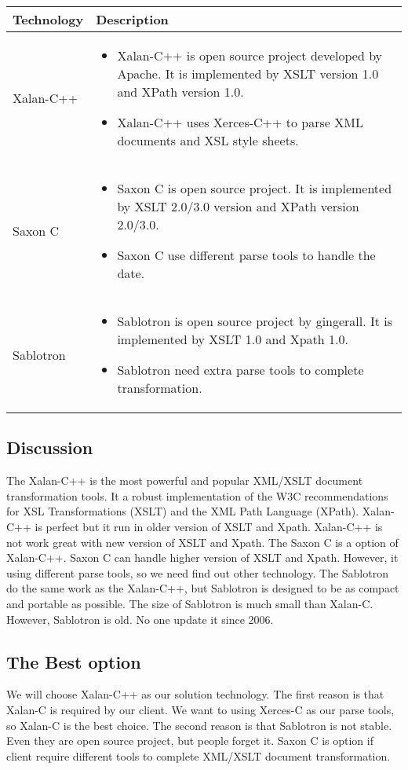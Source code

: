 \begin{center}
    \begin{tabular}{ | l | p{10cm} |}
    \hline
    Technology & Description  \\ \hline
    Xalan-C++ \cite{xalan} &
    \begin{itemize}
      \item Xalan-C++ is open source project developed by Apache. It is implemented by XSLT version 1.0 and XPath version 1.0.
      \item Xalan-C++ uses Xerces-C++ to parse XML documents and XSL style sheets.
    \end{itemize}\\ \hline
    Saxon C \cite{Saxon_c} &
    \begin{itemize}
      \item Saxon C is open source project. It is implemented by XSLT 2.0/3.0 version and XPath version 2.0/3.0.
      \item Saxon C use different parse tools to handle the date.
    \end{itemize}\\ \hline
    Sablotron \cite{Sablotron_intro} &
    \begin{itemize}
      \item Sablotron is open source project by gingerall. It is implemented by XSLT 1.0 and Xpath 1.0.
	  \item Sablotron need extra parse tools to complete transformation.
    \end{itemize}\\ \hline
    \end{tabular}
\end{center}

\subsection{Discussion}
The Xalan-C++ is the most powerful and popular XML/XSLT document transformation tools. It a robust implementation of the W3C recommendations for XSL Transformations (XSLT) and the XML Path Language (XPath). Xalan-C++ is perfect but it run in older version of XSLT and Xpath. Xalan-C++ is not work great with new version of XSLT and Xpath.
The Saxon C is a option of Xalan-C++. Saxon C can handle higher version of XSLT and Xpath. However, it using different parse tools, so we need find out other technology.
The Sablotron do the same work as the Xalan-C++, but Sablotron is designed to be as compact and portable as possible. The size of Sablotron is much small than Xalan-C. However, Sablotron is old. No one update it since 2006.

\subsection{The Best option}
We will choose Xalan-C++ as our solution technology. The first reason is that Xalan-C is required by our client. We want to using Xerces-C as our parse tools, so Xalan-C is the best choice. The second reason is that Sablotron is not stable. Even they are open source project, but people forget it. Saxon C is option if client require different tools to complete XML/XSLT document transformation.


